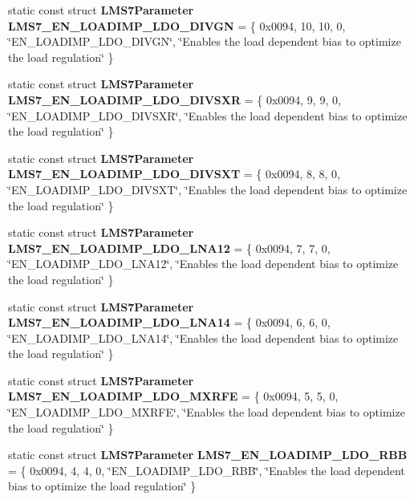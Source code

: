 \begin{DoxyCompactItemize}
\item 
static const struct {\bf L\+M\+S7\+Parameter} {\bf L\+M\+S7\+\_\+\+E\+N\+\_\+\+L\+O\+A\+D\+I\+M\+P\+\_\+\+L\+D\+O\+\_\+\+D\+I\+V\+GN} = \{ 0x0094, 10, 10, 0, \char`\"{}\+E\+N\+\_\+\+L\+O\+A\+D\+I\+M\+P\+\_\+\+L\+D\+O\+\_\+\+D\+I\+V\+G\+N\char`\"{}, \char`\"{}\+Enables the load dependent bias to optimize the load regulation\char`\"{} \}
\item 
static const struct {\bf L\+M\+S7\+Parameter} {\bf L\+M\+S7\+\_\+\+E\+N\+\_\+\+L\+O\+A\+D\+I\+M\+P\+\_\+\+L\+D\+O\+\_\+\+D\+I\+V\+S\+XR} = \{ 0x0094, 9, 9, 0, \char`\"{}\+E\+N\+\_\+\+L\+O\+A\+D\+I\+M\+P\+\_\+\+L\+D\+O\+\_\+\+D\+I\+V\+S\+X\+R\char`\"{}, \char`\"{}\+Enables the load dependent bias to optimize the load regulation\char`\"{} \}
\item 
static const struct {\bf L\+M\+S7\+Parameter} {\bf L\+M\+S7\+\_\+\+E\+N\+\_\+\+L\+O\+A\+D\+I\+M\+P\+\_\+\+L\+D\+O\+\_\+\+D\+I\+V\+S\+XT} = \{ 0x0094, 8, 8, 0, \char`\"{}\+E\+N\+\_\+\+L\+O\+A\+D\+I\+M\+P\+\_\+\+L\+D\+O\+\_\+\+D\+I\+V\+S\+X\+T\char`\"{}, \char`\"{}\+Enables the load dependent bias to optimize the load regulation\char`\"{} \}
\item 
static const struct {\bf L\+M\+S7\+Parameter} {\bf L\+M\+S7\+\_\+\+E\+N\+\_\+\+L\+O\+A\+D\+I\+M\+P\+\_\+\+L\+D\+O\+\_\+\+L\+N\+A12} = \{ 0x0094, 7, 7, 0, \char`\"{}\+E\+N\+\_\+\+L\+O\+A\+D\+I\+M\+P\+\_\+\+L\+D\+O\+\_\+\+L\+N\+A12\char`\"{}, \char`\"{}\+Enables the load dependent bias to optimize the load regulation\char`\"{} \}
\item 
static const struct {\bf L\+M\+S7\+Parameter} {\bf L\+M\+S7\+\_\+\+E\+N\+\_\+\+L\+O\+A\+D\+I\+M\+P\+\_\+\+L\+D\+O\+\_\+\+L\+N\+A14} = \{ 0x0094, 6, 6, 0, \char`\"{}\+E\+N\+\_\+\+L\+O\+A\+D\+I\+M\+P\+\_\+\+L\+D\+O\+\_\+\+L\+N\+A14\char`\"{}, \char`\"{}\+Enables the load dependent bias to optimize the load regulation\char`\"{} \}
\item 
static const struct {\bf L\+M\+S7\+Parameter} {\bf L\+M\+S7\+\_\+\+E\+N\+\_\+\+L\+O\+A\+D\+I\+M\+P\+\_\+\+L\+D\+O\+\_\+\+M\+X\+R\+FE} = \{ 0x0094, 5, 5, 0, \char`\"{}\+E\+N\+\_\+\+L\+O\+A\+D\+I\+M\+P\+\_\+\+L\+D\+O\+\_\+\+M\+X\+R\+F\+E\char`\"{}, \char`\"{}\+Enables the load dependent bias to optimize the load regulation\char`\"{} \}
\item 
static const struct {\bf L\+M\+S7\+Parameter} {\bf L\+M\+S7\+\_\+\+E\+N\+\_\+\+L\+O\+A\+D\+I\+M\+P\+\_\+\+L\+D\+O\+\_\+\+R\+BB} = \{ 0x0094, 4, 4, 0, \char`\"{}\+E\+N\+\_\+\+L\+O\+A\+D\+I\+M\+P\+\_\+\+L\+D\+O\+\_\+\+R\+B\+B\char`\"{}, \char`\"{}\+Enables the load dependent bias to optimize the load regulation\char`\"{} \}

\end{DoxyCompactItemize}
